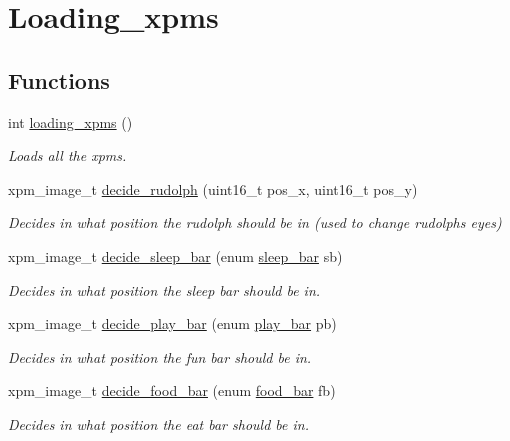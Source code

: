 \hypertarget{group__loading__xpms}{}\section{Loading\+\_\+xpms}
\label{group__loading__xpms}
\subsection*{Functions}
\begin{DoxyCompactItemize}
\item 
int \hyperlink{group__loading__xpms_ga462cc2177dd9b043e5bd5689bbeaf868}{loading\+\_\+xpms} ()
\begin{DoxyCompactList}\small\item\em Loads all the xpms. \end{DoxyCompactList}\item 
xpm\+\_\+image\+\_\+t \hyperlink{group__loading__xpms_gada234fac1a8886b19a988eb80e99ef15}{decide\+\_\+rudolph} (uint16\+\_\+t pos\+\_\+x, uint16\+\_\+t pos\+\_\+y)
\begin{DoxyCompactList}\small\item\em Decides in what position the rudolph should be in (used to change rudolph\textquotesingle{}s eyes) \end{DoxyCompactList}\item 
xpm\+\_\+image\+\_\+t \hyperlink{group__loading__xpms_gafe3e8d1842749e3b8831f03eaff01c99}{decide\+\_\+sleep\+\_\+bar} (enum \hyperlink{group__types_ga210774229705ea136db591a108c52d39}{sleep\+\_\+bar} sb)
\begin{DoxyCompactList}\small\item\em Decides in what position the sleep bar should be in. \end{DoxyCompactList}\item 
xpm\+\_\+image\+\_\+t \hyperlink{group__loading__xpms_gad678e45b98e3cc05dca5b24dad2be564}{decide\+\_\+play\+\_\+bar} (enum \hyperlink{group__types_gaac3396b3def300539a13396b352b7fca}{play\+\_\+bar} pb)
\begin{DoxyCompactList}\small\item\em Decides in what position the fun bar should be in. \end{DoxyCompactList}\item 
xpm\+\_\+image\+\_\+t \hyperlink{group__loading__xpms_ga2cdb6cdede927ad5a784d34d47577acf}{decide\+\_\+food\+\_\+bar} (enum \hyperlink{group__types_ga68b33015e0d4635ee8ddb795eca9d963}{food\+\_\+bar} fb)
\begin{DoxyCompactList}\small\item\em Decides in what position the eat bar should be in. \end{DoxyCompactList}\item 

\end{DoxyCompactItemize}
